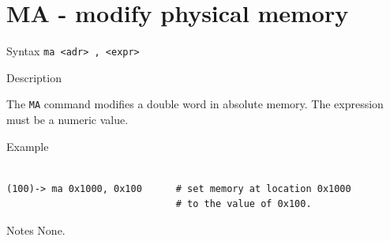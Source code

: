 %
%
\pagebreak
\section*{MA - modify physical memory}

\begin{iPageDescEntry}{Syntax}
\texttt{ma <adr> , <expr> } \\
\end{iPageDescEntry}

\begin{iPageDescEntry}{Description}

The \texttt{MA} command modifies a double word in absolute memory. The expression must be a numeric value.

\end{iPageDescEntry}

\begin{iPageDescOpEntry}{Example}
\begin{lstlisting}[style=iPageOpStyle]

(100)-> ma 0x1000, 0x100      # set memory at location 0x1000 
                              # to the value of 0x100.

\end{lstlisting}
\end{iPageDescOpEntry}

\begin{iPageDescEntry}{Notes}
None.
\end{iPageDescEntry}
